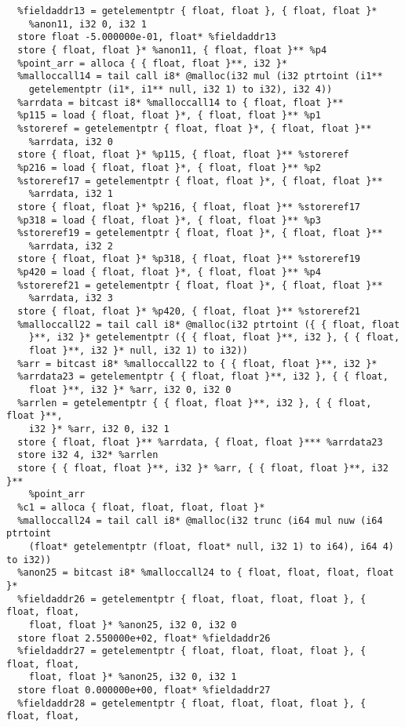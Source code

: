 \documentclass[main.tex]{subfiles}
\begin{document}
{\begin{lstlisting}
  %fieldaddr13 = getelementptr { float, float }, { float, float }* 
    %anon11, i32 0, i32 1
  store float -5.000000e-01, float* %fieldaddr13
  store { float, float }* %anon11, { float, float }** %p4
  %point_arr = alloca { { float, float }**, i32 }*
  %malloccall14 = tail call i8* @malloc(i32 mul (i32 ptrtoint (i1** 
    getelementptr (i1*, i1** null, i32 1) to i32), i32 4))
  %arrdata = bitcast i8* %malloccall14 to { float, float }**
  %p115 = load { float, float }*, { float, float }** %p1
  %storeref = getelementptr { float, float }*, { float, float }** 
    %arrdata, i32 0
  store { float, float }* %p115, { float, float }** %storeref
  %p216 = load { float, float }*, { float, float }** %p2
  %storeref17 = getelementptr { float, float }*, { float, float }** 
    %arrdata, i32 1
  store { float, float }* %p216, { float, float }** %storeref17
  %p318 = load { float, float }*, { float, float }** %p3
  %storeref19 = getelementptr { float, float }*, { float, float }** 
    %arrdata, i32 2
  store { float, float }* %p318, { float, float }** %storeref19
  %p420 = load { float, float }*, { float, float }** %p4
  %storeref21 = getelementptr { float, float }*, { float, float }** 
    %arrdata, i32 3
  store { float, float }* %p420, { float, float }** %storeref21
  %malloccall22 = tail call i8* @malloc(i32 ptrtoint ({ { float, float 
    }**, i32 }* getelementptr ({ { float, float }**, i32 }, { { float, 
    float }**, i32 }* null, i32 1) to i32))
  %arr = bitcast i8* %malloccall22 to { { float, float }**, i32 }*
  %arrdata23 = getelementptr { { float, float }**, i32 }, { { float, 
    float }**, i32 }* %arr, i32 0, i32 0
  %arrlen = getelementptr { { float, float }**, i32 }, { { float, float }**, 
    i32 }* %arr, i32 0, i32 1
  store { float, float }** %arrdata, { float, float }*** %arrdata23
  store i32 4, i32* %arrlen
  store { { float, float }**, i32 }* %arr, { { float, float }**, i32 }** 
    %point_arr
  %c1 = alloca { float, float, float, float }*
  %malloccall24 = tail call i8* @malloc(i32 trunc (i64 mul nuw (i64 ptrtoint 
    (float* getelementptr (float, float* null, i32 1) to i64), i64 4) to i32))
  %anon25 = bitcast i8* %malloccall24 to { float, float, float, float }*
  %fieldaddr26 = getelementptr { float, float, float, float }, { float, float, 
    float, float }* %anon25, i32 0, i32 0
  store float 2.550000e+02, float* %fieldaddr26
  %fieldaddr27 = getelementptr { float, float, float, float }, { float, float, 
    float, float }* %anon25, i32 0, i32 1
  store float 0.000000e+00, float* %fieldaddr27
  %fieldaddr28 = getelementptr { float, float, float, float }, { float, float, 

\end{lstlisting}}
\end{document}
